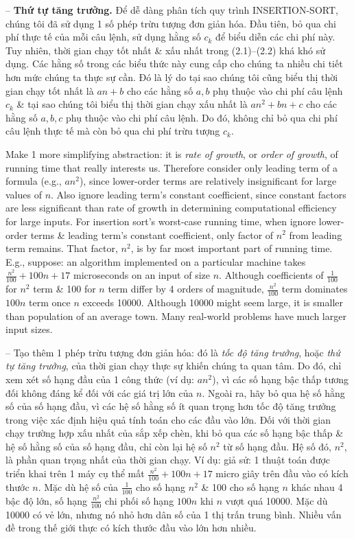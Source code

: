 \documentclass{article}
\begin{document}
\begin{itemize}
\begin{itemize}
\begin{itemize}
            -- {\bf Thứ tự tăng trưởng.} Để dễ dàng phân tích quy trình INSERTION-SORT, chúng tôi đã sử dụng 1 số phép trừu tượng đơn giản hóa. Đầu tiên, bỏ qua chi phí thực tế của mỗi câu lệnh, sử dụng hằng số $c_k$ để biểu diễn các chi phí này. Tuy nhiên, thời gian chạy tốt nhất \& xấu nhất trong (2.1)--(2.2) khá khó sử dụng. Các hằng số trong các biểu thức này cung cấp cho chúng ta nhiều chi tiết hơn mức chúng ta thực sự cần. Đó là lý do tại sao chúng tôi cũng biểu thị thời gian chạy tốt nhất là $an + b$ cho các hằng số $a,b$ phụ thuộc vào chi phí câu lệnh $c_k$ \& tại sao chúng tôi biểu thị thời gian chạy xấu nhất là $an^2 + bn + c$ cho các hằng số $a,b,c$ phụ thuộc vào chi phí câu lệnh. Do đó, không chỉ bỏ qua chi phí câu lệnh thực tế mà còn bỏ qua chi phí trừu tượng $c_k$.
            
            Make 1 more simplifying abstraction: it is {\it rate of growth}, or {\it order of growth}, of running time that really interests us. Therefore consider only leading term of a formula (e.g., $an^2$), since lower-order terms are relatively insignificant for large values of $n$. Also ignore leading term's constant coefficient, since constant factors are less significant than rate of growth in determining computational efficiency for large inputs. For insertion sort's worst-case running time, when ignore lower-order terms \& leading term's constant coefficient, only factor of $n^2$ from leading term remains. That factor, $n^2$, is by far most important part of running time. E.g., suppose: an algorithm implemented on a particular machine takes $\frac{n^2}{100} + 100n + 17$ microseconds on an input of size $n$. Although coefficients of $\frac{1}{100}$ for $n^2$ term \& 100 for $n$ term differ by 4 orders of magnitude, $\frac{n^2}{100}$ term dominates $100n$ term once $n$ exceeds 10000. Although 10000 might seem large, it is smaller than population of an average town. Many real-world problems have much larger input sizes.
            
            -- Tạo thêm 1 phép trừu tượng đơn giản hóa: đó là {\it tốc độ tăng trưởng}, hoặc {\it thứ tự tăng trưởng}, của thời gian chạy thực sự khiến chúng ta quan tâm. Do đó, chỉ xem xét số hạng đầu của 1 công thức (ví dụ: $an^2$), vì các số hạng bậc thấp tương đối không đáng kể đối với các giá trị lớn của $n$. Ngoài ra, hãy bỏ qua hệ số hằng số của số hạng đầu, vì các hệ số hằng số ít quan trọng hơn tốc độ tăng trưởng trong việc xác định hiệu quả tính toán cho các đầu vào lớn. Đối với thời gian chạy trường hợp xấu nhất của sắp xếp chèn, khi bỏ qua các số hạng bậc thấp \& hệ số hằng số của số hạng đầu, chỉ còn lại hệ số $n^2$ từ số hạng đầu. Hệ số đó, $n^2$, là phần quan trọng nhất của thời gian chạy. Ví dụ: giả sử: 1 thuật toán được triển khai trên 1 máy cụ thể mất $\frac{n^2}{100} + 100n + 17$ micro giây trên đầu vào có kích thước $n$. Mặc dù hệ số của $\frac{1}{100}$ cho số hạng $n^2$ \& 100 cho số hạng $n$ khác nhau 4 bậc độ lớn, số hạng $\frac{n^2}{100}$ chi phối số hạng $100n$ khi $n$ vượt quá 10000. Mặc dù 10000 có vẻ lớn, nhưng nó nhỏ hơn dân số của 1 thị trấn trung bình. Nhiều vấn đề trong thế giới thực có kích thước đầu vào lớn hơn nhiều.
            

\end{itemize}
\end{itemize}
\end{itemize}
\end{document}
